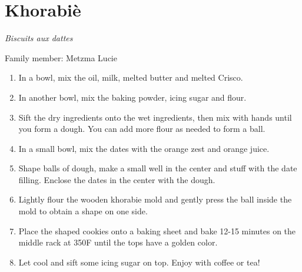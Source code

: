 \chapter{Khorabiè}
\label{ch:khorabie}


\textit{Biscuits aux dattes}

Family member: Metzma Lucie




\begin{enumerate}
    \item In a bowl, mix the oil, milk, melted butter and melted Crisco.
    \item In another bowl, mix the baking powder, icing sugar and flour.
    \item Sift the dry ingredients onto the wet ingredients, then mix with hands until you form a dough. You can add more flour as needed to form a ball.
    \item In a small bowl, mix the dates with the orange zest and orange juice.
    \item Shape balls of dough, make a small well in the center and stuff with the date filling. Enclose the dates in the center with the dough. 
    \item Lightly flour the wooden khorabie mold and gently press the ball inside the mold to obtain a shape on one side.
    \item Place the shaped cookies onto a baking sheet and bake 12-15 minutes on the middle rack at 350\degree F until the tops have a golden color. 
    \item Let cool and sift some icing sugar on top. Enjoy with coffee or tea!
\end{enumerate}
